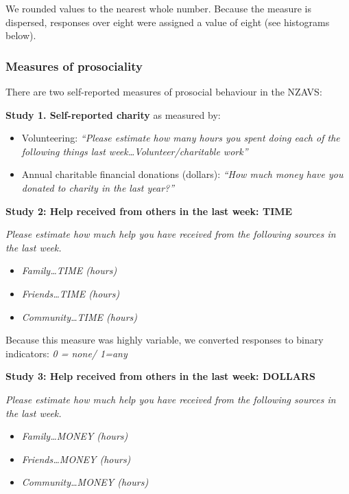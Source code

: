 \documentclass[
  single column]{article}
\providecommand{\tightlist}{%
  \setlength{\itemsep}{0pt}\setlength{\parskip}{0pt}}\usepackage{longtable,booktabs,array}
\begin{document}
We rounded values to the nearest whole number. Because the measure is
dispersed, responses over eight were assigned a value of eight (see
histograms below).

\subsubsection{Measures of prosociality}\label{measures-of-prosociality}

There are two self-reported measures of prosocial behaviour in the
NZAVS:

\textbf{Study 1. Self-reported charity} as measured by:

\begin{itemize}
\item
  Volunteering: \emph{``Please estimate how many hours you spent doing
  each of the following things last week\ldots Volunteer/charitable
  work''}
\item
  Annual charitable financial donations (dollars): \emph{``How much
  money have you donated to charity in the last year?''}
\end{itemize}

\textbf{Study 2: Help received from others in the last week: TIME}

\emph{Please estimate how much help you have received from the following
sources in the last week.}

\begin{itemize}
\tightlist
\item
  \emph{Family\ldots TIME (hours)}
\item
  \emph{Friends\ldots TIME (hours)}
\item
  \emph{Community\ldots TIME (hours)}
\end{itemize}

Because this measure was highly variable, we converted responses to
binary indicators: \emph{0 = none/ 1=any}

\textbf{Study 3: Help received from others in the last week: DOLLARS}

\emph{Please estimate how much help you have received from the following
sources in the last week.}

\begin{itemize}
\tightlist
\item
  \emph{Family\ldots MONEY (hours)}
\item
  \emph{Friends\ldots MONEY (hours)}
\item
  \emph{Community\ldots MONEY (hours)}
\end{itemize}
\end{document}

